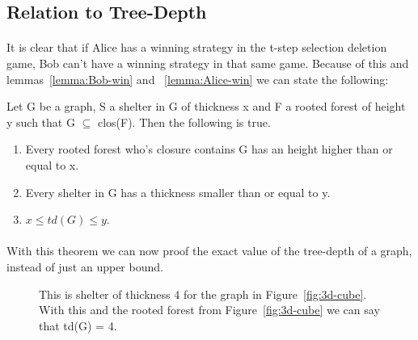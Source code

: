 \subsection{Relation to Tree-Depth}

\paragraph{}
It is clear that if Alice has a winning strategy in the t-step selection deletion game, Bob can't have a winning strategy in that same game. Because of this and lemmas~\ref{lemma:Bob-win} and ~\ref{lemma:Alice-win} we can state the following:
\begin{theorem}
Let G be a graph, S a shelter in G of thickness x and F a rooted forest of height y such that G $\subseteq$ clos(F). Then the following is true.
\begin{enumerate}
\item Every rooted forest who's closure contains G has an height higher than or equal to x.
\item Every shelter in G has a thickness smaller than or equal to y.
\item $x \leq td(G) \leq y$.
\end{enumerate}
\end{theorem}

\paragraph{}
With this theorem we can now proof the exact value of the tree-depth of a graph, instead of just an upper bound.

\begin{figure}[H]

\caption{This is shelter of thickness 4 for the graph in Figure~\ref{fig:3d-cube}. With this and the rooted forest from Figure~\ref{fig:3d-cube} we can say that td(G) = 4. 
\label{fig:3d-cube-shelter}}
\end{figure}